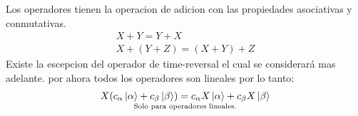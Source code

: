 \documentclass{article}
\begin{document}
Los operadores tienen la operacion de adicion con las propiedades asociativas y conmutativas. 
\begin{gather}
  X+Y = Y+X\\
  X+(Y+Z)=(X+Y)+Z
  \label{eq:prop_operadores}
\end{gather}
Existe la escepcion del operador de time-reversal el cual se considerará mas adelante. por ahora todos los operadores son lineales por lo tanto:
\begin{gather}
  \underset{\text{Solo para operadores lineales.}}{X(c_\alpha \ket{\alpha}+c_\beta \ket{\beta}) = c_\alpha X \ket{\alpha}+c_\beta X \ket{\beta}} 
  \label{eq:operadores_lineales}
\end{gather}
\end{document}
